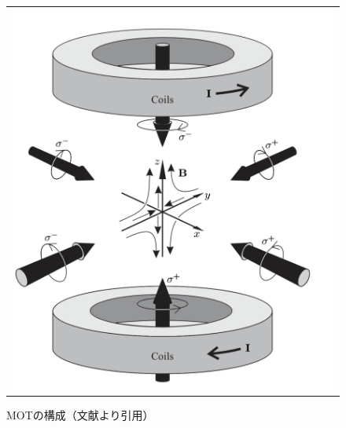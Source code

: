 \documentclass[uplatex,dvipdfmx,a4paper,report,papersize,11pt]{jsbook}
\begin{document}
\begin{figure}[htpb]
  \centering
    \begin{tabular}{c}


      \begin{minipage}{0.50\hsize}
        \centering
          \includegraphics[keepaspectratio, scale=0.35, angle=0]
                          {figures/MOT_circular_polarization.png}
                          \caption{MOTの構成（文献\cite{Foot:1080846}より引用）}
                          \label{MOT_circular_polarization}
      \end{minipage}



\end{tabular}
\end{figure}
\end{document}
